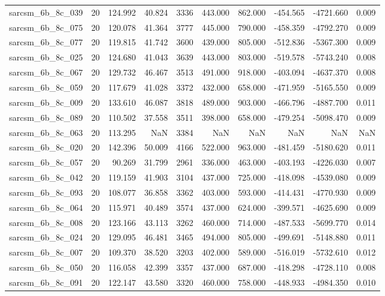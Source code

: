 \begin{tabular}{lrrrrrrrrr}
sarcsm\_6b\_8c\_039 & 20 & 124.992 & 40.824 & 3336 & 443.000 & 862.000 & -454.565 & -4721.660 & 0.009 \\
sarcsm\_6b\_8c\_075 & 20 & 120.078 & 41.364 & 3777 & 445.000 & 790.000 & -458.359 & -4792.270 & 0.009 \\
sarcsm\_6b\_8c\_077 & 20 & 119.815 & 41.742 & 3600 & 439.000 & 805.000 & -512.836 & -5367.300 & 0.009 \\
sarcsm\_6b\_8c\_025 & 20 & 124.680 & 41.043 & 3639 & 443.000 & 803.000 & -519.578 & -5743.240 & 0.008 \\
sarcsm\_6b\_8c\_067 & 20 & 129.732 & 46.467 & 3513 & 491.000 & 918.000 & -403.094 & -4637.370 & 0.008 \\
sarcsm\_6b\_8c\_059 & 20 & 117.679 & 41.028 & 3372 & 432.000 & 658.000 & -471.959 & -5165.550 & 0.009 \\
sarcsm\_6b\_8c\_009 & 20 & 133.610 & 46.087 & 3818 & 489.000 & 903.000 & -466.796 & -4887.700 & 0.011 \\
sarcsm\_6b\_8c\_089 & 20 & 110.502 & 37.558 & 3511 & 398.000 & 658.000 & -479.254 & -5098.470 & 0.009 \\
sarcsm\_6b\_8c\_063 & 20 & 113.295 & NaN & 3384 & NaN & NaN & NaN & NaN & NaN \\
sarcsm\_6b\_8c\_020 & 20 & 142.396 & 50.009 & 4166 & 522.000 & 963.000 & -481.459 & -5180.620 & 0.011 \\
sarcsm\_6b\_8c\_057 & 20 & 90.269 & 31.799 & 2961 & 336.000 & 463.000 & -403.193 & -4226.030 & 0.007 \\
sarcsm\_6b\_8c\_042 & 20 & 119.159 & 41.903 & 3104 & 437.000 & 725.000 & -418.098 & -4539.080 & 0.009 \\
sarcsm\_6b\_8c\_093 & 20 & 108.077 & 36.858 & 3362 & 403.000 & 593.000 & -414.431 & -4770.930 & 0.009 \\
sarcsm\_6b\_8c\_064 & 20 & 115.971 & 40.489 & 3574 & 437.000 & 624.000 & -399.571 & -4625.690 & 0.009 \\
sarcsm\_6b\_8c\_008 & 20 & 123.166 & 43.113 & 3262 & 460.000 & 714.000 & -487.533 & -5699.770 & 0.014 \\
sarcsm\_6b\_8c\_024 & 20 & 129.095 & 46.481 & 3465 & 494.000 & 805.000 & -499.691 & -5148.880 & 0.011 \\
sarcsm\_6b\_8c\_007 & 20 & 109.370 & 38.520 & 3203 & 402.000 & 589.000 & -516.019 & -5732.610 & 0.012 \\
sarcsm\_6b\_8c\_050 & 20 & 116.058 & 42.399 & 3357 & 437.000 & 687.000 & -418.298 & -4728.110 & 0.008 \\
sarcsm\_6b\_8c\_091 & 20 & 122.147 & 43.580 & 3320 & 460.000 & 758.000 & -448.933 & -4984.350 & 0.010 \\

\end{tabular}
